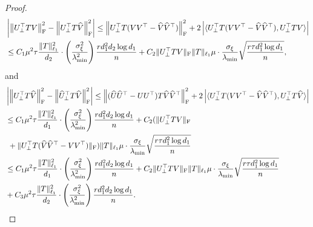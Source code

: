 \documentclass[12pt]{article}
\newcommand{\tF}{{\rm F}}
\newcommand{\abs}[1]{\left\lvert#1\right\rvert}
\newcommand{\norm}[1]{\left\lVert#1\right\rVert}
\theoremstyle{plain}
\begin{document}
\begin{proof}
$$
\begin{aligned}
     &\abs{\norm{ U_{\perp}^\top T V }^2_{\tF}- \norm{  U_{\perp}^\top T \widehat V }^2_{\tF}} \le \norm{U^\top_{\perp} T (VV^\top- \widehat V \widehat V^\top) }_{\tF}^2 + 2\abs{\langle U^\top_{\perp} T (VV^\top- \widehat V \widehat V^\top), U^\top_{\perp} T V  \rangle} \\
& \leq C_1 \mu^2\tau \frac{\|T\|_{\ell_1}^2}{d_2} \cdot\left(\frac{\sigma_{\xi}^2}{\lambda_{\min}^2}\right) \frac{r d_1^2 d_2 \log d_1}{n}+C_2\| U^\top_\perp T {V} \|_{\mathrm{F}}\|T\|_{\ell_1} \mu \cdot \frac{\sigma_{\xi}}{\lambda_{\min}} \sqrt{\frac{r\tau d_1^2 \log d_1}{n}},
\end{aligned}
$$
and
$$
\begin{aligned}
     &\abs{\norm{  U_{\perp}^\top T \widehat V }^2_{\tF}- \norm{ \widehat U_{\perp}^\top T \widehat V }^2_{\tF}} \le \norm{ (\widehat U \widehat U^\top- UU^\top) T \widehat V \widehat V^\top }_{\tF}^2 + 2\abs{\langle U^\top_{\perp} T (VV^\top- \widehat V \widehat V^\top), U^\top_{\perp} T \widehat V  \rangle} \\
     & \leq C_1 \mu^2\tau \frac{\|T\|_{\ell_1}^2}{d_1} \cdot\left(\frac{\sigma_{\xi}^2}{\lambda_{\min}^2}\right) \frac{r d_1^2 d_2 \log d_1}{n}+C_2 (\| U^\top_\perp T  V \|_{\mathrm{F}} \\
     & \ +{\| U^\top_\perp T (\widehat V \widehat V^\top -VV^\top ) \|_{\mathrm{F}}} )\|T\|_{\ell_1} \mu \cdot \frac{\sigma_{\xi}}{\lambda_{\min}} \sqrt{\frac{r\tau d_1^2 \log d_1}{n}} \\
      & \leq C_1 \mu^2\tau \frac{\|T\|_{\ell_1}^2}{d_1} \cdot\left(\frac{\sigma_{\xi}^2}{\lambda_{\min}^2}\right) \frac{r d_1^2 d_2 \log d_1}{n}+ C_2\| U^\top_\perp T {V} \|_{\mathrm{F}}\|T\|_{\ell_1} \mu \cdot \frac{\sigma_{\xi}}{\lambda_{\min}} \sqrt{\frac{r\tau d_1^2 \log d_1}{n}} \\
      & + C_3 \mu^2\tau \frac{\|T\|_{\ell_1}^2}{d_2} \cdot\left(\frac{\sigma_{\xi}^2}{\lambda_{\min}^2}\right) \frac{r d_1^2 d_2 \log d_1}{n}.
\end{aligned}
$$


\end{proof}
\end{document}

